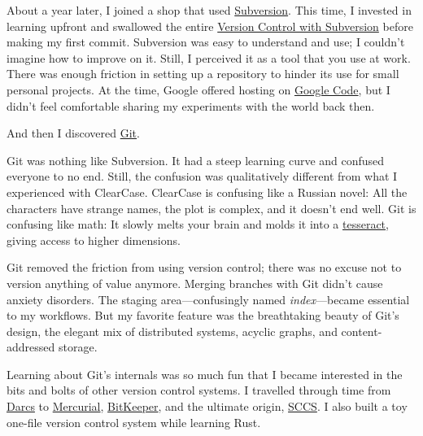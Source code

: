 \documentclass{article}
\begin{document}
About a year later, I joined a shop that used \href{https://subversion.apache.org/}{Subversion}.
This time, I invested in learning upfront and swallowed the entire \href{https://svnbook.red-bean.com/}{Version Control with Subversion} before making my first commit.
Subversion was easy to understand and use; I couldn't imagine how to improve on it.
Still, I perceived it as a tool that you use at work.
There was enough friction in setting up a repository to hinder its use for small personal projects.
At the time, Google offered hosting on \href{https://code.google.com/}{Google Code}, but I didn't feel comfortable sharing my experiments with the world back then.

And then I discovered \href{https://git-scm.com/}{Git}.

Git was nothing like Subversion.
It had a steep learning curve and confused everyone to no end.
Still, the confusion was qualitatively different from what I experienced with ClearCase.
ClearCase is confusing like a Russian novel: All the characters have strange names, the plot is complex, and it doesn't end well.
Git is confusing like math: It slowly melts your brain and molds it into a \href{https://en.wikipedia.org/wiki/Tesseract}{tesseract}, giving access to higher dimensions.

Git removed the friction from using version control; there was no excuse not to version anything of value anymore.
Merging branches with Git didn't cause anxiety disorders.
The staging area---confusingly named \emph{index}---became essential to my workflows.
But my favorite feature was the breathtaking beauty of Git's design, the elegant mix of distributed systems, acyclic graphs, and content-addressed storage.

Learning about Git's internals was so much fun that I became interested in the bits and bolts of other version control systems.
I travelled through time from \href{https://darcs.net/}{Darcs} to \href{https://www.mercurial-scm.org/}{Mercurial}, \href{https://www.bitkeeper.org/}{BitKeeper}, and the ultimate origin, \href{https://en.wikipedia.org/wiki/Source_Code_Control_System}{SCCS}.
I also built a toy one-file version control system while learning Rust.
\end{document}
